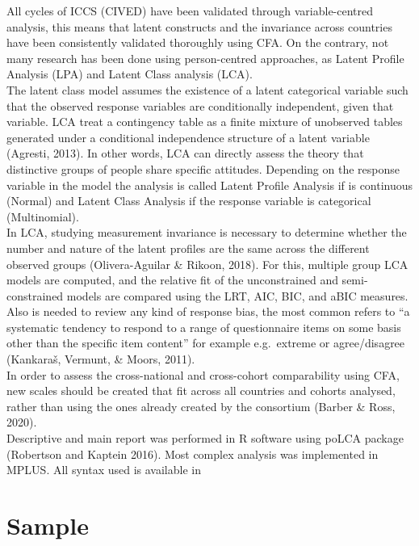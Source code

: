 \documentclass[12pt,twoside]{reedthesis}
\begin{document}
All cycles of ICCS (CIVED) have been validated through variable-centred analysis, this means that latent constructs and the invariance across countries have been consistently validated thoroughly using CFA. On the contrary, not many research has been done using person-centred approaches, as Latent Profile Analysis (LPA) and Latent Class analysis (LCA).\\
\newline 
The latent class model assumes the existence of a latent categorical variable such that the observed response variables are conditionally independent, given that variable. LCA treat a contingency table as a finite mixture of unobserved tables generated under a conditional independence structure of a latent variable (Agresti, 2013). In other words, LCA can directly assess the theory that distinctive groups of people share specific attitudes. Depending on the response variable in the model the analysis is called Latent Profile Analysis if is continuous (Normal) and Latent Class Analysis if the response variable is categorical (Multinomial).\\
\newline 
In LCA, studying measurement invariance is necessary to determine whether the number and nature of the latent profiles are the same across the different observed groups (Olivera-Aguilar \& Rikoon, 2018). For this, multiple group LCA models are computed, and the relative fit of the unconstrained and semi-constrained models are compared using the LRT, AIC, BIC, and aBIC measures. Also is needed to review any kind of response bias, the most common refers to ``a systematic tendency to respond to a range of questionnaire items on some basis other than the specific item content'' for example e.g.~extreme or agree/disagree (Kankaraš, Vermunt, \& Moors, 2011).\\
\newline 
In order to assess the cross-national and cross-cohort comparability using CFA, new scales should be created that fit across all countries and cohorts analysed, rather than using the ones already created by the consortium (Barber \& Ross, 2020).\\
\newline 
Descriptive and main report was performed in R software using poLCA package (Robertson and Kaptein 2016). Most complex analysis was implemented in MPLUS. All syntax used is available in

\hypertarget{sample}{%
\section{Sample}\label{sample}}
\end{document}
